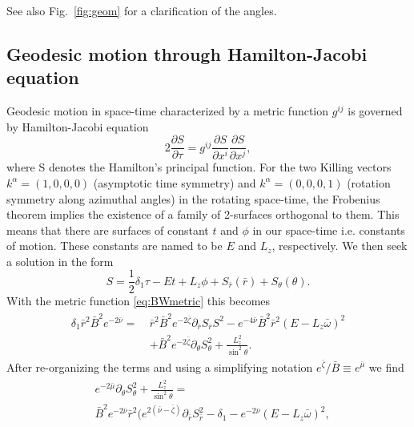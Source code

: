 \documentclass[iop, usenatbib]{emulateapj}
\newcommand{\be}{\begin{equation}}
\newcommand{\ee}{\end{equation}}
\newcommand{\pd}{\ensuremath{\partial}} %
\newcommand{\rb}{\ensuremath{\bar{r}}}
\newcommand{\wb}{\ensuremath{\bar{\omega}}}
\newcommand{\nub}{\ensuremath{\bar{\nu}}}
\newcommand{\zetab}{\ensuremath{\bar{\zeta}}}
\newcommand{\Bb}{\ensuremath{\bar{B}}}
\newcommand{\mub}{\ensuremath{\bar{\mu}}}
\begin{document}
See also Fig.~\ref{fig:geom} for a clarification of the angles.

\subsection{Geodesic motion through Hamilton-Jacobi equation}
Geodesic motion in space-time characterized by a metric function $g^{ij}$ is governed by Hamilton-Jacobi equation
\be
2\frac{\pd S}{\pd \tau} = g^{ij} \frac{\pd S}{\pd x^i}\frac{\pd S}{\pd x^j},
\ee
where S denotes the Hamilton's principal function.
For the two Killing vectors $k^{\alpha} = (1,0,0,0)$ (asymptotic time symmetry) and $k^{\alpha} = (0,0,0,1)$ (rotation symmetry along azimuthal angles) in the rotating space-time, the Frobenius theorem implies the existence of a family of 2-surfaces orthogonal to them.
This means that there are surfaces of constant $t$ and $\phi$ in our space-time i.e. constants of motion.
These constants are named to be $E$ and $L_z$, respectively.
We then seek a solution in the form
\be
S = \frac{1}{2}\delta_1 \tau - Et + L_z\phi + S_{\rb}(\rb) + S_{\theta}(\theta).
\ee
With the metric function \eqref{eq:BWmetric} this becomes
\begin{align}\begin{split} 
    \delta_1 \rb^2 \Bb^2 e^{-2\nub} =~& \rb^2 \Bb^2 e^{-2\zetab} \pd_{\rb}S_{\rb}S^2 - e^{-4\nub} \Bb^2 \rb^2 (E - L_z \wb)^2 \\
                                & + \Bb^2 e^{-2\zetab} \pd_{\theta}S_{\theta}^2 + \frac{L_z^2}{\sin^2\theta}.
\end{split}\end{align}
After re-organizing the terms and using a simplifying notation $e^{\zetab}/\Bb \equiv e^{\mub}$ we find
\begin{align}\begin{split}\label{eq:S}
& e^{-2\mub}\pd_{\theta}S_{\theta}^2 + \frac{L_z^2}{\sin^2\theta} = \\ 
& \Bb^2 e^{-2\nub}\rb^2 ( e^{2(\nub-\zetab)} \pd_{\rb}S_{\rb}^2 -\delta_{1} - e^{-2\nub}(E - L_z \wb)^2,
\end{split}\end{align}
\end{document}
